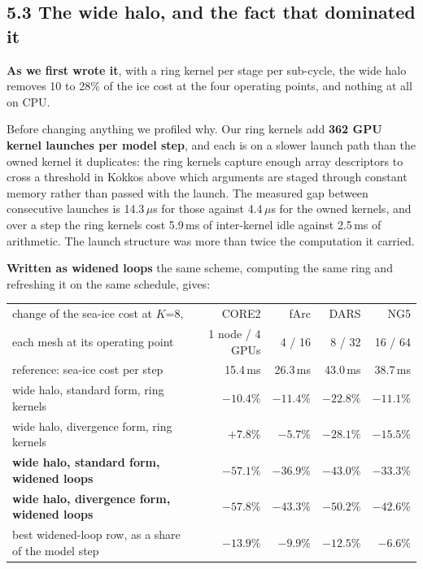 \documentclass[11pt,a4paper]{article}
\begin{document}
\subsection*{5.3 The wide halo, and the fact that dominated it}

\textbf{As we first wrote it}, with a ring kernel per stage per sub-cycle, the wide halo removes
10 to 28\% of the ice cost at the four operating points, and nothing at all on CPU.

Before changing anything we profiled why. Our ring kernels add \textbf{362 GPU kernel launches per
model step}, and each is on a slower launch path than the owned kernel it duplicates: the ring
kernels capture enough array descriptors to cross a threshold in Kokkos above which arguments are
staged through constant memory rather than passed with the launch. The measured gap between
consecutive launches is 14.3\,$\mu$s for those against 4.4\,$\mu$s for the owned kernels, and over
a step the ring kernels cost 5.9\,ms of inter-kernel idle against 2.5\,ms of arithmetic. The
launch structure was more than twice the computation it carried.

\textbf{Written as widened loops} the same scheme, computing the same ring and refreshing it on the
same schedule, gives:

\begin{center}\small
\begin{tabular}{@{}lrrrr@{}}
\toprule
change of the sea-ice cost at $K$=8, & CORE2 & fArc & DARS & NG5 \\
each mesh at its operating point & 1 node / 4 GPUs & 4 / 16 & 8 / 32 & 16 / 64 \\
\midrule
reference: sea-ice cost per step             & 15.4\,ms & 26.3\,ms & 43.0\,ms & 38.7\,ms \\
wide halo, standard form, ring kernels       & $-10.4\%$ & $-11.4\%$ & $-22.8\%$ & $-11.1\%$ \\
wide halo, divergence form, ring kernels     & $+7.8\%$  & $-5.7\%$  & $-28.1\%$ & $-15.5\%$ \\
\textbf{wide halo, standard form, widened loops}   & $\mathbf{-57.1\%}$ & $\mathbf{-36.9\%}$ & $\mathbf{-43.0\%}$ & $\mathbf{-33.3\%}$ \\
\textbf{wide halo, divergence form, widened loops} & $\mathbf{-57.8\%}$ & $\mathbf{-43.3\%}$ & $\mathbf{-50.2\%}$ & $\mathbf{-42.6\%}$ \\
\midrule
best widened-loop row, as a share of the model step & $-13.9\%$ & $-9.9\%$ & $-12.5\%$ & $-6.6\%$ \\
\bottomrule
\end{tabular}
\end{center}
\end{document}
